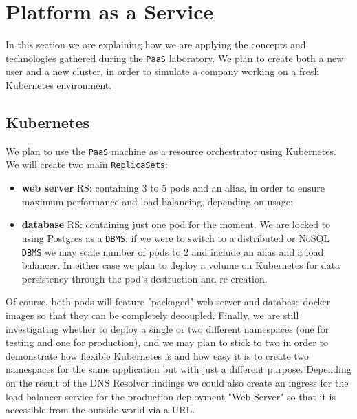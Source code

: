 \section{Platform as a Service}
\label{cha:paas}
In this section we are explaining how we are applying the concepts and technologies gathered during the \verb=PaaS= laboratory.
\newline
We plan to create both a new user and a new cluster, in order to simulate a company working on a fresh Kubernetes environment.

\subsection{Kubernetes}
We plan to use the \verb=PaaS= machine as a resource orchestrator using Kubernetes. We will create two main \verb=ReplicaSets=:

\begin{itemize}
    \item \textbf{web server} RS: containing 3 to 5 pods and an alias, in order to ensure maximum performance and load balancing, depending on usage;%
    \item \textbf{database} RS: containing just one pod for the moment. We are locked to using Postgres as a \verb=DBMS=: if we were to switch to a distributed or NoSQL \verb=DBMS= we may scale number of pods to 2 and include an alias and a load balancer. In either case we plan to deploy a volume on Kubernetes for data persistency through the pod's destruction and re-creation.
\end{itemize}

Of course, both pods will feature "packaged" web server and database docker images so that they can be completely decoupled. Finally, we are still investigating whether to deploy a single or two different namespaces (one for testing and one for production), and we may plan to stick to two in order to demonstrate how flexible Kubernetes is and how easy it is to create two namespaces for the same application but with just a different purpose.%
\newline
Depending on the result of the DNS Resolver findings we could also create an ingress for the load balancer service for the production deployment "Web Server" so that it is accessible from the outside world via a URL.